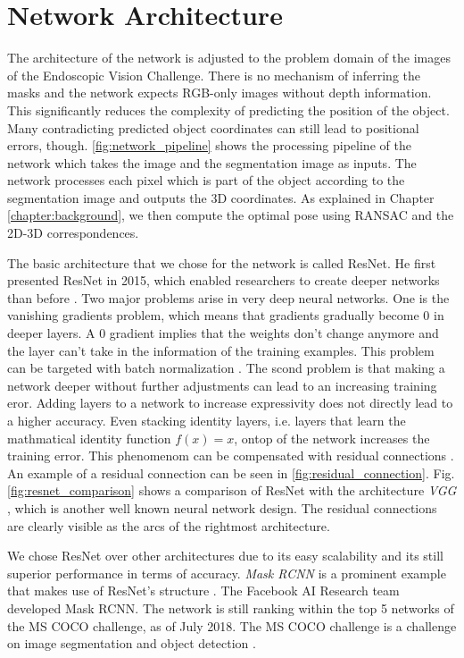 \section{Network Architecture}

The architecture of the network is adjusted to the problem domain of the images of the Endoscopic Vision Challenge. There is no mechanism of inferring the masks and the network expects RGB-only images without depth information. This significantly reduces the complexity of predicting the position of the object. Many contradicting predicted object coordinates can still lead to positional errors, though. \fig \ref{fig:network_pipeline} shows the processing pipeline of the network which takes the image and the segmentation image as inputs. The network processes each pixel which is part of the object according to the segmentation image and outputs the 3D coordinates. As explained in Chapter \ref{chapter:background}, we then compute the optimal pose using RANSAC and the 2D-3D correspondences.

The basic architecture that we chose for the network is called ResNet. He \etal first presented ResNet in 2015, which enabled researchers to create deeper networks than before \cite{resnet}. Two major problems arise in very deep neural networks. One is the vanishing gradients problem, which means that gradients gradually become 0 in deeper layers. A 0 gradient implies that the weights don't change anymore and the layer can't take in the information of the training examples. This problem can be targeted with batch normalization \cite{resnet}. The scond problem is that making a network deeper without further adjustments can lead to an increasing training eror. Adding layers to a network to increase expressivity does not directly lead to a higher accuracy. Even stacking identity layers, i.e. layers that learn the mathmatical identity function $f(x) = x$, ontop of the network increases the training error. This phenomenom can be compensated with residual connections \cite{resnet}. An example of a residual connection can be seen in \fig \ref{fig:residual_connection}. Fig. \ref{fig:resnet_comparison} shows a comparison of ResNet with the architecture \textit{VGG} \cite{vgg}, which is another well known neural network design. The residual connections are clearly visible as the arcs of the rightmost architecture.

We chose ResNet over other architectures due to its easy scalability and its still superior performance in terms of accuracy. \textit{Mask RCNN} is a prominent example that makes use of ResNet's structure \cite{mask_rcnn}. The Facebook AI Research team developed Mask RCNN. The network is still ranking within the top 5 networks of the MS COCO challenge, as of July 2018. The MS COCO challenge is a challenge on image segmentation and object detection \cite{mscoco}.


